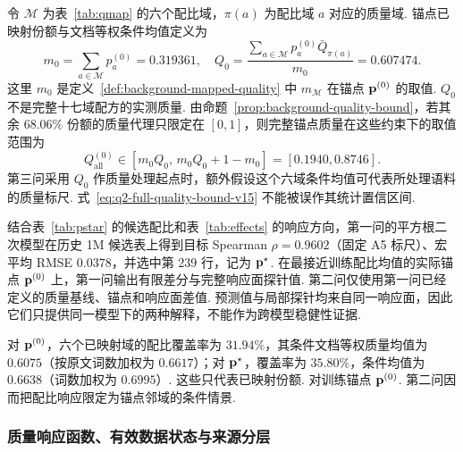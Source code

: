 令 $\mathcal M$ 为表~\ref{tab:qmap} 的六个配比域，$\pi(a)$ 为配比域 $a$ 对应的质量域. 锚点已映射份额与文档等权条件均值定义为
\begin{equation}\label{eq:q0-mapping-v9}
m_0=\sum_{a\in\mathcal M}p_a^{(0)}=0.319361,\quad Q_0=\frac{\sum_{a\in\mathcal M}p_a^{(0)}\bar Q_{\pi(a)}}{m_0}=0.607474.
\end{equation}
这里 $m_0$ 是定义~\ref{def:background-mapped-quality} 中 $m_{\mathcal M}$ 在锚点 $\mathbf p^{(0)}$ 的取值. $Q_0$ 不是完整十七域配方的实测质量. 由命题~\ref{prop:background-quality-bound}，若其余 $68.06\%$ 份额的质量代理只限定在 $[0,1]$，则完整锚点质量在这些约束下的取值范围为
\begin{equation}\label{eq:q2-full-quality-bound-v15}
Q_{\mathrm{all}}^{(0)}\in[m_0Q_0,\,m_0Q_0+1-m_0]=[0.1940,0.8746].
\end{equation}
第三问采用 $Q_0$ 作质量处理起点时，额外假设这个六域条件均值可代表所处理语料的质量标尺. 式~\eqref{eq:q2-full-quality-bound-v15} 不能被误作其统计置信区间. 

结合表~\ref{tab:pstar} 的候选配比和表~\ref{tab:effects} 的响应方向，第一问的平方根二次模型在历史 1M 候选表上得到目标 Spearman $\rho=0.9602$（固定 A5 标尺）、宏平均 RMSE $0.0378$，并选中第 239 行，记为 $\mathbf p^\star$. 在最接近训练配比均值的实际锚点 $\mathbf p^{(0)}$ 上，第一问输出有限差分与完整响应面探针值. 第二问仅使用第一问已经定义的质量基线、锚点和响应面差值. 预测值与局部探针均来自同一响应面，因此它们只提供同一模型下的两种解释，不能作为跨模型稳健性证据. 

对 $\mathbf p^{(0)}$，六个已映射域的配比覆盖率为 $31.94\%$，其条件文档等权质量均值为 $0.6075$（按原文词数加权为 $0.6617$）；对 $\mathbf p^\star$，覆盖率为 $35.80\%$，条件均值为 $0.6638$（词数加权为 $0.6995$）. 这些只代表已映射份额. 对训练锚点 $\mathbf p^{(0)}$. 第二问因而把配比响应限定为锚点邻域的条件情景.

\subsubsection{质量响应函数、有效数据状态与来源分层}

